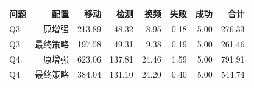 \begin{tabular}{lrrrrrrr}
\toprule
问题 & 配置 & 移动 & 检测 & 换频 & 失败 & 成功 & 合计 \\
\midrule
Q3 & 原增强 & 213.89 & 48.32 & 8.95 & 0.18 & 5.00 & 276.33 \\
Q3 & 最终策略 & 197.58 & 49.31 & 9.38 & 0.19 & 5.00 & 261.46 \\
Q4 & 原增强 & 623.06 & 137.81 & 24.46 & 1.59 & 5.00 & 791.91 \\
Q4 & 最终策略 & 384.04 & 131.10 & 24.20 & 0.40 & 5.00 & 544.74 \\
\bottomrule
\end{tabular}
